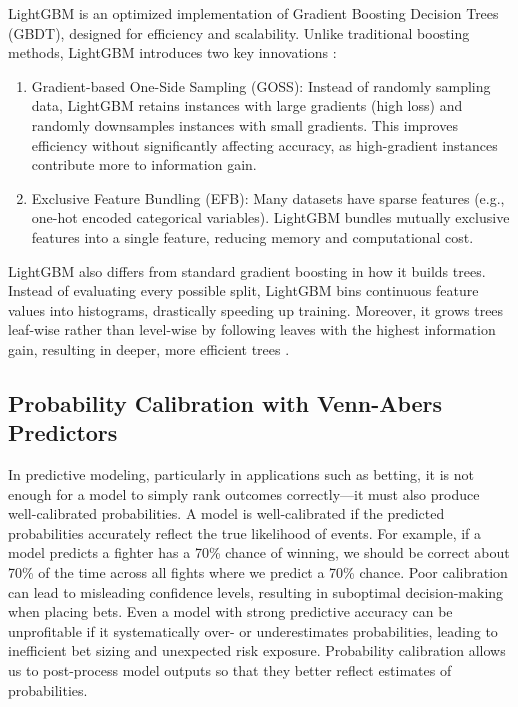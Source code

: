 \documentclass[12pt,twoside]{report}
\begin{document}
LightGBM is an optimized implementation of Gradient Boosting Decision Trees (GBDT), designed for efficiency and scalability. Unlike traditional boosting methods, LightGBM introduces two key innovations \citep{lightgbm_2017}:

\begin{enumerate}
    \item Gradient-based One-Side Sampling (GOSS): Instead of randomly sampling data, LightGBM retains instances with large gradients (high loss) and randomly downsamples instances with small gradients. This improves efficiency without significantly affecting accuracy, as high-gradient instances contribute more to information gain.

    \item Exclusive Feature Bundling (EFB):  Many datasets have sparse features (e.g., one-hot encoded categorical variables). LightGBM bundles mutually exclusive features into a single feature, reducing memory and computational cost.
\end{enumerate}
LightGBM also differs from standard gradient boosting in how it builds trees. Instead of evaluating every possible split, LightGBM bins continuous feature values into histograms, drastically speeding up training. Moreover, it grows trees leaf-wise rather than level-wise by following  leaves with the highest information gain, resulting in deeper, more efficient trees \citep{lightgbm_2017}.

\subsection{Probability Calibration with Venn-Abers Predictors}

In predictive modeling, particularly in applications such as betting, it is not enough for a model to simply rank outcomes correctly---it must also produce well-calibrated probabilities. A model is well-calibrated if the predicted probabilities accurately reflect the true likelihood of events. For example, if a model predicts a fighter has a 70\% chance of winning, we should be correct about 70\% of the time across all fights where we predict a 70\% chance. Poor calibration can lead to misleading confidence levels, resulting in suboptimal decision-making when placing bets. Even a model with strong predictive accuracy can be unprofitable if it systematically over- or underestimates probabilities, leading to inefficient bet sizing and unexpected risk exposure. Probability calibration allows us to post-process model outputs so that they better reflect estimates of probabilities.
\end{document}
